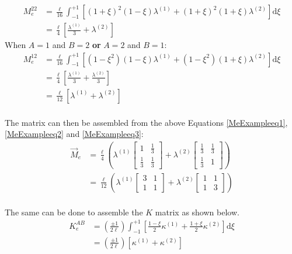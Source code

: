 \begin{equation}\label{MeExampleeq2}
\begin{aligned}
M_e^{22} &= \frac{\ell}{16} \int_{-1}^{+1} \left[
	(1+\xi)^2(1-\xi)\lambda^{(1)} + (1+\xi)^2(1+\xi)\lambda^{(2)}
\right] \text{d}\xi \\
&= \frac{\ell}{4} \left[
	\frac{\lambda^{(1)}}{3}
	+ \lambda^{(2)}
\right]
\end{aligned}
\end{equation}
 When $A=1$ and $B=2$ \textbf{or} $A=2$ and $B=1$:
\begin{equation}\label{MeExampleeq3}
\begin{aligned}
M_e^{12} &= \frac{\ell}{16} \int_{-1}^{+1} \left[
	(1-\xi^2)(1-\xi) \lambda^{(1)}
	+ (1-\xi^2)(1+\xi)\lambda^{(2)}
\right] \text{d} \xi \\
&= \frac{\ell}{4}\left[
	\frac{\lambda^{(1)}}{3}
	+ \frac{\lambda^{(2)}}{3}
\right] \\
&= \frac{\ell}{12}\left[
	\lambda^{(1)}
	+ \lambda^{(2)}
\right] \\
\end{aligned}
\end{equation}

 The matrix can then be assembled from the above Equations \ref{MeExampleeq1},\ref{MeExampleeq2} and \ref{MeExampleeq3}:
\begin{equation}\label{Meassembled}
\begin{aligned}
\vec{M}_e &= \frac{\ell}{4} \left(
	\lambda^{(1)} \begin{bmatrix} 1 & \frac{1}{3} \\ \frac{1}{3} & \frac{1}{3} \end{bmatrix}
	+ \lambda^{(2)} \begin{bmatrix} \frac{1}{3} & \frac{1}{3} \\ \frac{1}{3} & 1 \end{bmatrix}
\right) \\
&= \frac{\ell}{12} \left(
	\lambda^{(1)} \begin{bmatrix} 3 & 1 \\ 1 & 1 \end{bmatrix}
	+ \lambda^{(2)} \begin{bmatrix} 1 & 1 \\ 1 & 3 \end{bmatrix}
\right) \\
\end{aligned}
\end{equation}

The same can be done to assemble the $K$ matrix as shown below.
\begin{equation}\label{Keass1}
\begin{aligned}
K_e^{AB} &= \left(\frac{\pm 1}{2\ell}\right) \int_{-1}^{+1} \left[
	\frac{1-\xi}{2} \kappa^{(1)}
	+ \frac{1+\xi}{2} \kappa^{(2)}
\right] \text{d}\xi \\
&= \left(\frac{\pm 1}{2\ell}\right) \left[ \kappa^{(1)} + \kappa^{(2)} \right]
\end{aligned}
\end{equation}


